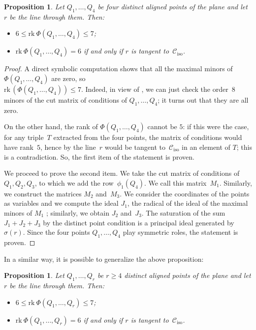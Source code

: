 \documentclass{amsart}
\theoremstyle{plain}
\newtheorem{prop}[lemma]{Proposition}
\theoremstyle{definition}
\newcommand{\iso}{\mathcal{C}_{\mathrm{iso}}}
\newcommand{\rk}{\ensuremath{\mathrm{rk}}}
\begin{document}
\begin{prop}
\label{proposition:four_aligned}
Let $Q_1, \dotsc, Q_4$ be four distinct aligned points of the plane and
let $r$ be the line through them. Then:
\begin{itemize}
\item $6 \leq \rk  \ \Phi(Q_1, \dotsc, Q_4) \leq 7$;
\item $\rk  \ \Phi(Q_1, \dotsc, Q_4) = 6$ if and only if $r$ is tangent
to~$\iso$.
\end{itemize}
\end{prop}
\begin{proof}
  A direct symbolic computation shows that all the maximal minors of~$\Phi(Q_1, \dotsc, Q_4)$ are
  zero, so \\
  $\rk \,(\Phi(Q_1, \dotsc, Q_4)) \leq 7$.
  Indeed, in view of , we can just check the order~$8$ minors of the cut matrix of conditions of $Q_1, \dotsc, Q_4$; it turns out that they are all zero.

  On the other hand, the rank of $\Phi(Q_1, \dotsc, Q_4)$ cannot be $5$:
  if this were the case, for any triple~$T$ extracted from the four points, the matrix of conditions would have rank~$5$, hence by  the line~$r$ would be tangent to~$\iso$ in an element of $T$; this is a contradiction.
  So, the first item of the statement is proven.

  We proceed to prove the second item.
  We take the cut matrix of conditions of~$Q_1, Q_2, Q_3$, to which we add the row~$\phi_1(Q_4)$.
  We call this matrix~$M_1$.
  Similarly, we construct the matrices $M_2$ and~$M_3$.
  We consider the coordinates of the points as variables and we compute
  the ideal $J_1$, the radical of the ideal of the maximal minors of $M_1$ ; similarly, we obtain $J_2$ and~$J_3$.
  The saturation of the sum $J_1 + J_2 + J_3$ by the distinct point condition is a principal ideal generated by~$\sigma(r)$.
  Since the four points $Q_1, \dotsc, Q_4$ play symmetric roles, the statement is proven.
\end{proof}

In a similar way, it is possible to generalize the above proposition:
\begin{prop}
\label{proposition:n_aligned}
Let $Q_1, \dotsc, Q_r$ be $r\geq 4$ distinct aligned points of the plane and
let $r$ be the line through them. Then:
\begin{itemize}
\item $6 \leq \rk  \ \Phi(Q_1, \dotsc, Q_r) \leq 7$;
\item $\rk  \ \Phi(Q_1, \dotsc, Q_r) = 6$ if and only if $r$ is tangent
to~$\iso$.
\end{itemize}
\end{prop}
\end{document}
